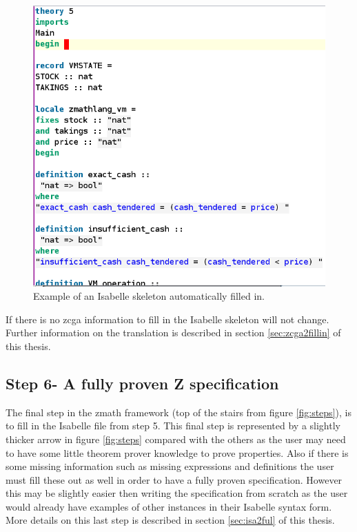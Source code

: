 \begin{figure}[H]
 \begin{center}
 \includegraphics [scale=0.3]{Figures/Design/fillin1.png}
 \caption{Example of an Isabelle skeleton automatically filled in.}
 \label{fig:fillin1}
\end{center}
\end{figure} 

 If there is no \gls{zcga} information to fill in the Isabelle skeleton will not
 change. Further information on the translation is described in section
 \ref{sec:zcga2fillin} of this thesis.

\subsection{Step 6- A fully proven Z specification}

The final step in the \gls{zmath} framework (top of the stairs from figure
\ref{fig:steps}), is to fill in the Isabelle file from step 5. This final step
is represented by a slightly thicker arrow in figure \ref{fig:steps} compared
with the others as the user may need to have some little theorem prover
knowledge to prove properties. Also if there is some missing information such as
missing expressions and definitions the user must fill these out as well in
order to have a fully proven specification. However this may be slightly easier
then writing the specification from scratch as the user would already have
examples of other instances in their Isabelle syntax form. More details on this
last step is described in section \ref{sec:isa2ful} of this thesis.

